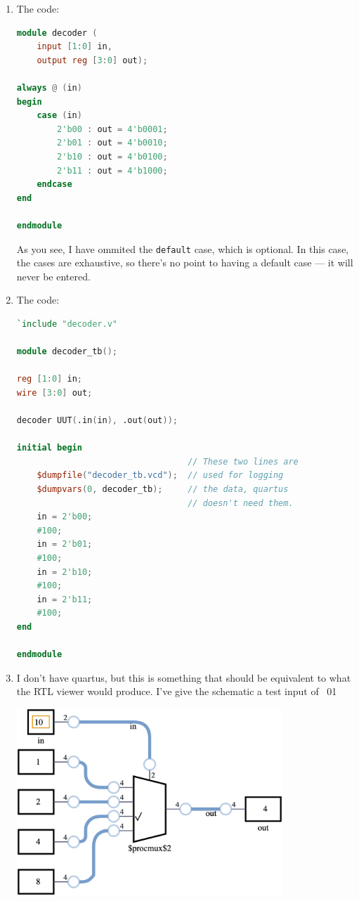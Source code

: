 \documentclass{article}
\begin{document}
    \begin{enumerate}
        \item {
            The code:
            \begin{lstlisting}[language=verilog]
module decoder (
    input [1:0] in,
    output reg [3:0] out);

always @ (in)
begin
    case (in)
        2'b00 : out = 4'b0001;
        2'b01 : out = 4'b0010;
        2'b10 : out = 4'b0100;
        2'b11 : out = 4'b1000;
    endcase
end

endmodule\end{lstlisting}

            As you see, I have ommited the \verb|default| case, which is optional. In this case, the cases are exhaustive, so there's no point to having a default case --- it will never be entered.
        }
        \item {
            The code:
            \bf
            \begin{lstlisting}[language=verilog]
`include "decoder.v"

module decoder_tb();

reg [1:0] in;
wire [3:0] out;

decoder UUT(.in(in), .out(out));

initial begin
                                  // These two lines are
    $dumpfile("decoder_tb.vcd");  // used for logging
    $dumpvars(0, decoder_tb);     // the data, quartus
                                  // doesn't need them.
    in = 2'b00;
    #100;
    in = 2'b01;
    #100;
    in = 2'b10;
    #100;
    in = 2'b11;
    #100;
end

endmodule\end{lstlisting}
        }
        \item {
            I don't have quartus, but this is something that should be equivalent to what the RTL viewer would produce. I've give the schematic a test input of \ 01

            \includegraphics[width=10cm]{circuit.png}

}
\end{enumerate}
\end{document}
